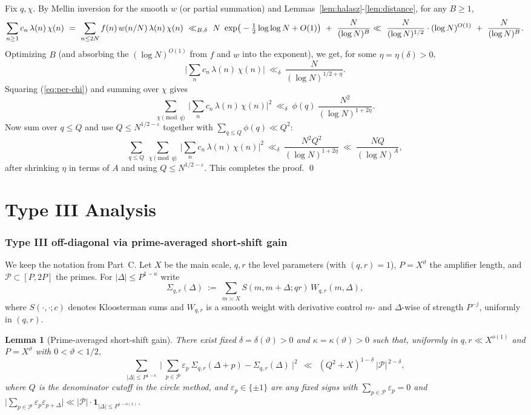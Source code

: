 \documentclass[11pt]{article}
\def\eqref#1{(\ref{#1})}%
\newtheorem{lemma}{Lemma}[part]
\theoremstyle{definition}
\theoremstyle{remark}
\numberwithin{equation}{part}
\begin{document}
Fix $q,\chi$. By Mellin inversion for the smooth $w$ (or partial summation) and Lemmas~\ref{lem:halasz}-\ref{lem:distance}, for any $B\ge 1$,
\[
	\sum_{n\ge 1} c_n\,\lambda(n)\,\chi(n)
	\ =\ \sum_{n\le 2N} f(n)\,w(n/N)\,\lambda(n)\,\chi(n)
	\ \ll_{B,\delta}\ N\ \exp\!\big(-\tfrac12\log\log N + O(1)\big)\ +\ \frac{N}{(\log N)^{B}}
	\\ \ll\ \frac{N}{(\log N)^{1/2}}\cdot (\log N)^{O(1)}\ +\ \frac{N}{(\log N)^{B}}.
\]
Optimizing $B$ (and absorbing the $(\log N)^{O(1)}$ from $f$ and $w$ into the exponent), we get, for some $\eta=\eta(\delta)>0$,
\begin{equation}\label{eq:per-chi}
	\Bigg|\sum_{n} c_n\,\lambda(n)\,\chi(n)\Bigg|\ \ll_{\delta}\ \frac{N}{(\log N)^{1/2+\eta}}.
\end{equation}
Squaring \eqref{eq:per-chi} and summing over $\chi$ gives
\[
	\sum_{\chi\!\!\!\pmod q}\ \Bigg|\sum_{n} c_n\,\lambda(n)\,\chi(n)\Bigg|^2
	\ \ll_{\delta}\ \phi(q)\ \frac{N^2}{(\log N)^{1+2\eta}}.
\]
Now sum over $q\le Q$ and use $Q\le N^{1/2-\varepsilon}$ together with $\sum_{q\le Q}\phi(q)\ll Q^2$:
\[
	\sum_{q\le Q}\ \sum_{\chi\!\!\!\pmod q}\ \Bigg|\sum_{n} c_n\,\lambda(n)\,\chi(n)\Bigg|^2
	\ \ll_{\delta}\ \frac{N^2 Q^2}{(\log N)^{1+2\eta}}
	\ \ll\ \frac{NQ}{(\log N)^A},
\]
after shrinking $\eta$ in terms of $A$ and using $Q\le N^{1/2-\varepsilon}$. This completes the proof.
\qed


\part{Type III Analysis}

\section{Type III off-diagonal via prime-averaged short-shift gain}\label{sec:typeIII-SSG}

We keep the notation from Part~C. Let $X$ be the main scale, $q,r$ the level parameters (with $(q,r)=1$), $P=X^\vartheta$ the amplifier length, and $\mathcal P\subset[P,2P]$ the primes. For $|\Delta|\le P^{1-\kappa}$ write
\[
	\Sigma_{q,r}(\Delta)\ :=\ \sum_{m\asymp X} S(m,m+\Delta;qr)\,W_{q,r}(m,\Delta),
\]
where $S(\cdot,\cdot;c)$ denotes Kloosterman sums and $W_{q,r}$ is a smooth weight with derivative control $m$- and $\Delta$-wise of strength $P^{-j}$, uniformly in $(q,r)$.

\begin{lemma}[Prime-averaged short-shift gain]\label{lem:passg}
	There exist fixed $\delta=\delta(\vartheta)>0$ and $\kappa=\kappa(\vartheta)>0$ such that, uniformly in $q,r\ll X^{o(1)}$ and $P=X^\vartheta$ with $0<\vartheta<1/2$,
	\[
		\sum_{|\Delta|\le P^{1-\kappa}}\ \Big|\ \sum_{p\in\mathcal P}\varepsilon_p\ \Sigma_{q,r}(\Delta+p)-\Sigma_{q,r}(\Delta)\ \Big|^2
		\ \ \ll\ \ (Q^2+X)^{1-\delta}\ |\mathcal P|^{\,2-\delta},
	\]
	where $Q$ is the denominator cutoff in the circle method, and $\varepsilon_p\in\{\pm1\}$ are any fixed signs with $\sum_{p\in\mathcal P}\varepsilon_p=0$ and $\big|\sum_{p\in\mathcal P}\varepsilon_p\varepsilon_{p+\Delta}\big|\ll |\mathcal P|\cdot \mathbf{1}_{|\Delta|\le P^{1-o(1)}}$.
\end{lemma}
\end{document}
